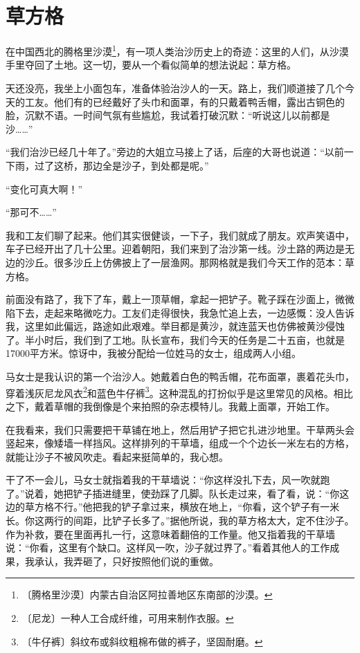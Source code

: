 \documentclass[12pt,UTF-8,openany]{ctexbook}
\begin{document}
\chapter{草方格}

\begin{Large}
    
    在中国西北的腾格里沙漠\footnote{〔腾格里沙漠〕内蒙古自治区阿拉善地区东南部的沙漠。}，有一项人类治沙历史上的奇迹：这里的人们，从沙漠手里夺回了土地。这一切，要从一个看似简单的想法说起：草方格。
    
    天还没亮，我坐上小面包车，准备体验治沙人的一天。路上，我们顺道接了几个今天的工友。他们有的已经戴好了头巾和面罩，有的只戴着鸭舌帽，露出古铜色的脸，沉默不语。一时间气氛有些尴尬，我试着打破沉默：“听说这儿以前都是沙……”
    
    “我们治沙已经几十年了。”旁边的大姐立马接上了话，后座的大哥也说道：“以前一下雨，过了这桥，那边全是沙子，到处都是呢。”
    
    “变化可真大啊！”
    
    “那可不……”
    
    我和工友们聊了起来。他们其实很健谈，一下子，我们就成了朋友。欢声笑语中，车子已经开出了几十公里。迎着朝阳，我们来到了治沙第一线。沙土路的两边是无边的沙丘。很多沙丘上仿佛披上了一层渔网。那网格就是我们今天工作的范本：草方格。
    
    前面没有路了，我下了车，戴上一顶草帽，拿起一把铲子。靴子踩在沙面上，微微陷下去，走起来略微吃力。工友们走得很快，我急忙追上去，一边感慨：没人告诉我，这里如此偏远，路途如此艰难。举目都是黄沙，就连蓝天也仿佛被黄沙侵蚀了。半小时后，我们到了工地。队长宣布，我们今天的任务是二十五亩，也就是17000平方米。惊讶中，我被分配给一位姓马的女士，组成两人小组。
    
    马女士是我认识的第一个治沙人。她戴着白色的鸭舌帽，花布面罩，裹着花头巾，穿着浅灰尼龙风衣\footnote{〔尼龙〕一种人工合成纤维，可用来制作衣服。}和蓝色牛仔裤\footnote{〔牛仔裤〕斜纹布或斜纹粗棉布做的裤子，坚固耐磨。}。这种混乱的打扮似乎是这里常见的风格。相比之下，戴着草帽的我倒像是个来拍照的杂志模特儿。我戴上面罩，开始工作。
    
    在我看来，我们只需要把干草铺在地上，然后用铲子把它扎进沙地里。干草两头会竖起来，像矮墙一样挡风。这样排列的干草墙，组成一个个边长一米左右的方格，就能让沙子不被风吹走。看起来挺简单的，我心想。
    
    干了不一会儿，马女士就指着我的干草墙说：“你这样没扎下去，风一吹就跑了。”说着，她把铲子插进缝里，使劲踩了几脚。队长走过来，看了看，说：“你这边的草方格不行。”他把我的铲子拿过来，横放在地上，“你看，这个铲子有一米长。你这两行的间距，比铲子长多了。”据他所说，我的草方格太大，定不住沙子。作为补救，要在里面再扎一行，这意味着翻倍的工作量。他又指着我的干草墙说：“你看，这里有个缺口。这样风一吹，沙子就过界了。”看着其他人的工作成果，我承认，我弄砸了，只好按照他们说的重做。
    

\end{Large}
\end{document}

